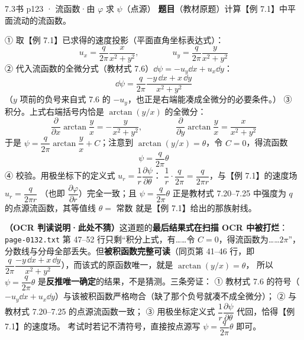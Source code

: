 \begin{liti}{7.3}{书 p123 · 流函数·由 $\varphi$ 求 $\psi$（点源）}
\textbf{题目}（教材原题）计算【例 7.1】中平面流动的流函数。
\begin{jie}
① 取【例 7.1】已求得的速度投影（平面直角坐标表达式）：
\[ u_x=\frac{q}{2\pi}\frac{x}{x^2+y^2},\qquad\qquad
   u_y=\frac{q}{2\pi}\frac{y}{x^2+y^2} \]
② 代入流函数的全微分式（教材式 7.6）$\dd\psi=-u_y\dd x+u_x\dd y$：
\[ \dd\psi=\frac{q}{2\pi}\frac{-y\,\dd x+x\,\dd y}{x^2+y^2} \]
（$y$ 项前的负号来自式 7.6 的 $-u_y$，也正是右端能凑成全微分的必要条件。）
③ 积分。上式右端括号内恰是 $\arctan(y/x)$ 的全微分：
\[ \frac{\partial}{\partial x}\arctan\frac{y}{x}=-\frac{y}{x^2+y^2},\qquad\qquad
   \frac{\partial}{\partial y}\arctan\frac{y}{x}=\frac{x}{x^2+y^2} \]
于是 $\psi=\dfrac{q}{2\pi}\arctan\dfrac{y}{x}+C$；注意到 $\arctan(y/x)=\theta$，令 $C=0$，得流函数
\[ \psi=\frac{q}{2\pi}\theta \]
④ 校验。用极坐标下的定义式 $u_r=\dfrac1r\dfrac{\partial\psi}{\partial\theta}$：
$\dfrac1r\cdot\dfrac{q}{2\pi}=\dfrac{q}{2\pi r}$，与【例 7.1】的速度场 $u_r=\dfrac{q}{2\pi r}$
（也即 $\dfrac{\partial\varphi}{\partial r}$）完全一致；且 $\psi=\dfrac{q}{2\pi}\theta$ 正是教材式
7.20--7.25 中强度为 $q$ 的点源流函数，其等值线 $\theta=$ 常数 就是【例 7.1】给出的那族射线。
\end{jie}

\begin{tishi}
\textbf{（OCR 判读说明·此处不猜）}这道题的\textbf{最后结果式在扫描 OCR 中被打烂}：
\texttt{page-0132.txt} 第 47--52 行只剩“积分上式，有……令 $C=0$，得流函数为……$2\pi$”，
分数线与分母全部丢失。但\textbf{被积函数完整可读}（同页第 41--46 行，即
$\dfrac{q}{2\pi}\dfrac{-y\,\dd x+x\,\dd y}{x^2+y^2}$），而该式的原函数唯一，就是 $\arctan(y/x)=\theta$，
所以 $\psi=\dfrac{q}{2\pi}\theta$ 是\textbf{反推唯一确定}的结果，不是猜测。三条旁证：
① 教材式 7.6 的符号（$-u_y\dd x+u_x\dd y$）与该被积函数严格吻合（缺了那个负号就凑不成全微分）；
② 与教材式 7.20--7.25 的点源流函数一致；
③ 用极坐标定义式 $\dfrac1r\dfrac{\partial\psi}{\partial\theta}$ 代回，恰得【例 7.1】的速度场。
考试时若记不清符号，直接按点源写 $\psi=\dfrac{q}{2\pi}\theta$ 即可。
\end{tishi}
\end{liti}

